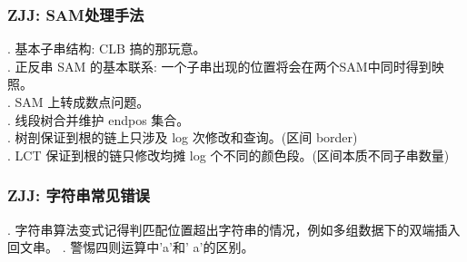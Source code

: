\subsubsection*{ZJJ: SAM处理手法}
. 基本子串结构: CLB 搞的那玩意。\\	
. 正反串 SAM 的基本联系: 一个子串出现的位置将会在两个SAM中同时得到映照。\\	
. SAM 上转成数点问题。\\	
. 线段树合并维护 endpos 集合。\\	
. 树剖保证到根的链上只涉及 log 次修改和查询。(区间 border) \\	
. LCT 保证到根的链只修改均摊 log 个不同的颜色段。(区间本质不同子串数量)

\subsubsection*{ZJJ: 字符串常见错误}
. 字符串算法变式记得判匹配位置超出字符串的情况，例如多组数据下的双端插入回文串。
. 警惕四则运算中'a'和' a'的区别。